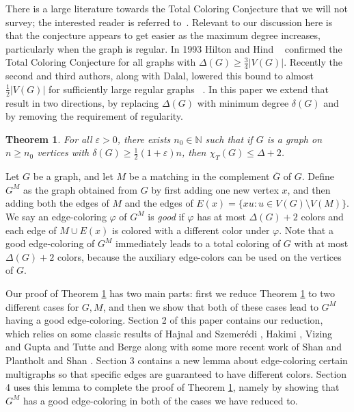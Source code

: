 \documentclass[11pt, oneside]{article}
\newtheorem{theorem}{Theorem}
\begin{document}
There is a large literature towards the Total Coloring Conjecture that we will not survey; the interested reader is referred to~\cite{DMS,  MR4679850, JT}. Relevant to our discussion here is that the conjecture appears to get easier as the maximum degree increases, particularly when the graph is regular. In 1993 Hilton and Hind ~\cite{MR1226136} confirmed the Total Coloring Conjecture for all graphs with $\Delta(G) \ge \frac{3}{4} |V(G)|$. Recently the second and third authors, along with Dalal, lowered this bound to almost $\frac{1}{2} |V(G)|$ for sufficiently large regular graphs~\cite{DMS} . In this paper we extend that result in two directions, by replacing $\Delta(G)$ with minimum degree $\delta(G)$ and by removing the requirement of regularity.

\begin{theorem}\label{main} For all $\varepsilon>0$, there exists $n_0\in\mathbb{N}$ such that if $G$ is a graph on $n\geq n_0$ vertices with $\delta(G)\geq\tfrac{1}{2}(1 + \varepsilon)n$,  then $\chi_T(G)\leq \Delta+2$.
\end{theorem}

Let $G$ be a graph, and let $M$ be a matching in the complement $\overline{G}$ of $G$. Define $G^M$ as the graph obtained from $G$ by first adding one new vertex $x$, and then adding both the edges of $M$ and the edges of $E(x)=\{xu: u\in V(G)\setminus V(M)\}$. We say an edge-coloring $\varphi$ of $G^M$ is \emph{good} if $\varphi$ has at most $\Delta(G)+2$ colors and each edge of $M\cup E(x)$ is colored with a different color under $\varphi$. Note that a good edge-coloring of $G^M$ immediately leads to a total coloring of $G$ with at most $\Delta(G)+2$ colors, because the auxiliary edge-colors can be used on the vertices of $G$. 

Our proof of Theorem \ref{main} has two main parts: first we reduce Theorem \ref{main} to two different cases for $G, M$, and then we show that both of these cases lead to $G^M$ having a good edge-coloring. Section 2 of this paper contains our reduction, which relies on some classic results of Hajnal and Szemer\'{e}di \cite{HS}, Hakimi \cite{H1962}, Vizing and Gupta \cite{Vizing-2-classes, Gupta-67} and Tutte and Berge \cite{TutteTBformula, BergeTBformula} along with some more recent work of Shan \cite{SHAN2022429} and Plantholt and Shan \cite{Plantholt-Shan}.  Section 3 contains a new lemma about edge-coloring certain multigraphs so that specific edges are guaranteed to have different colors. Section 4 uses this lemma to complete the proof of Theorem \ref{main}, namely by showing that $G^M$ has a good edge-coloring in both of the cases we have reduced to.
\end{document}
